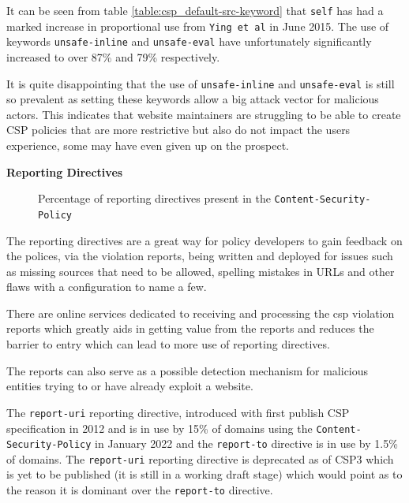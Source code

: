 \documentclass{mscreport}
\begin{document}
\noindent
It can be seen from table \ref{table:csp_default-src-keyword} that \texttt{self} has had a marked increase in proportional use from \texttt{Ying et al} \cite{Ying2016-ag} in June 2015. The use of keywords \texttt{unsafe-inline} and \texttt{unsafe-eval} have unfortunately significantly increased to over 87\% and 79\% respectively.

\vspace{0.3cm} \noindent
It is quite disappointing that the use of \texttt{unsafe-inline} and \texttt{unsafe-eval} is still so prevalent as setting these keywords allow a big attack vector for malicious actors. This indicates that website maintainers are struggling to be able to create CSP policies that are more restrictive but also do not impact the users experience, some may have even given up on the prospect.

\vspace{0.7cm} \noindent
\textbf{Reporting Directives}

\begin{figure}[t]
	\begin{center}
		\caption{Percentage of reporting directives present in the \texttt{Content-Security-Policy}}
		\label{fig:csp_by_reporting_directives}
	\end{center}
\end{figure}

\noindent
The reporting directives are a great way for policy developers to gain feedback on the polices, via the violation reports, being written and deployed for issues such as missing sources that need to be allowed, spelling mistakes in URLs and other flaws with a configuration to name a few.

\vspace{0.3cm} \noindent
There are online services dedicated to receiving and processing the csp violation reports which greatly aids in getting value from the reports and reduces the barrier to entry which can lead to more use of reporting directives.

\vspace{0.3cm} \noindent
The reports can also serve as a possible detection mechanism for malicious entities trying to or have already exploit a website.

\vspace{0.3cm} \noindent
The \texttt{report-uri} reporting directive, introduced with first publish CSP specification in 2012 and is in use by 15\% of domains using the \texttt{Content-Security-Policy} in January 2022 and the \texttt{report-to} directive is in use by 1.5\% of domains. The \texttt{report-uri} reporting directive is deprecated as of CSP3 which is yet to be published (it is still in a working draft stage) which would point as to the reason it is dominant over the \texttt{report-to} directive.
\end{document}
